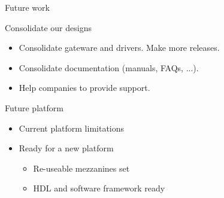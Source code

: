 \documentclass[compress,red]{beamer}
\begin{document}
\begin{frame}{Future work}

  \begin{block}{Consolidate our designs}
    \begin{itemize}
    \item Consolidate gateware and drivers. Make more releases.
    \item Consolidate documentation (manuals, FAQs, ...).
    \item Help companies to provide support.
    \end{itemize}
  \end{block}

  \begin{block}{Future platform}
    \begin{itemize}
    \item Current platform limitations
    \item Ready for a new platform
      \begin{itemize}
      \item Re-useable mezzanines set
      \item HDL and software framework ready
      \end{itemize}
    \end{itemize}
  \end{block}

  \note[item]{}

\end{frame}
\end{document}
